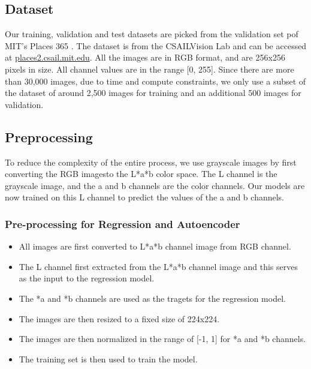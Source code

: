 \documentclass{article}
\begin{document}
\subsection{Dataset}
Our training, validation and test datasets are picked from the validation set pof MIT's Places 365 \cite{7}. The dataset is from the CSAILVision Lab and can be accessed at \url{places2.csail.mit.edu}.
All the images are in RGB format, and are 256x256 pixels in size. All channel values are in the range [0, 255].
Since there are more than 30,000 images, due to time and compute constraints, we only use a subset of the dataset of around 2,500 images for training and an additional 500 images for validation.

\subsection{Preprocessing}
To reduce the complexity of the entire process, we use grayscale images by first converting the RGB imagesto the L*a*b color space.
The L channel is the grayscale image, and the a and b channels are the color channels.
Our models are now trained on this L channel to predict the values of the a and b channels.

\subsubsection{Pre-processing for Regression and Autoencoder}
\begin{itemize}
    \item All images are first converted to L*a*b channel image from RGB channel.
    \item The L channel first extracted from the L*a*b channel image and this serves as the input to the regression model.
    \item The *a and *b channels are used as the tragets for the regression model.
    \item The images are then resized to a fixed size of 224x224.
    \item The images are then normalized in the range of [-1, 1] for *a and *b channels.
    \item The training set is then used to train the model.
\end{itemize}
\end{document}
